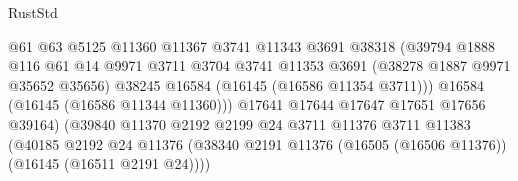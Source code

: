 \begin{lexlean}{RustStd}
\begin{coremodule}
                                            @61
                                            @63
                                            @5125
                                            @11360
                                            @11367
                                            @3741
                                            @11343
                                            @3691
                                            @38318
                                            (@39794
                                              @1888
                                              @116
                                              @61
                                              @14
                                              @9971
                                              @3711
                                              @3704
                                              @3741
                                              @11353
                                              @3691
                                              (@38278 @1887 @9971 @35652 @35656)
                                              @38245
                                              @16584
                                              (@16145 (@16586 @11354 @3711)))
                                            @16584
                                            (@16145 (@16586 @11344 @11360)))
                                          @17641
                                          @17644
                                          @17647
                                          @17651
                                          @17656
                                          @39164)
                                        (@39840
                                          @11370
                                          @2192
                                          @2199
                                          @24
                                          @3711
                                          @11376
                                          @3711
                                          @11383
                                          (@40185
                                            @2192
                                            @24
                                            @11376
                                            (@38340
                                              @2191
                                              @11376
                                              (@16505 (@16506 @11376))
                                              (@16145 (@16511 @2191 @24))))

\end{coremodule}
\end{lexlean}
